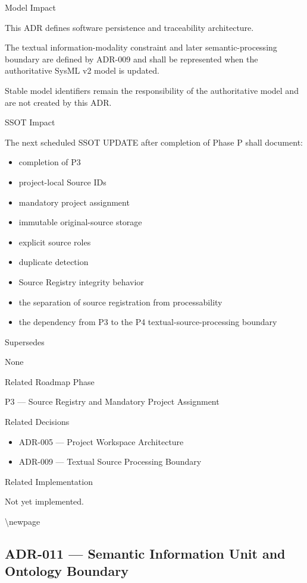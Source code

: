Model Impact

This ADR defines software persistence and traceability architecture.

The textual information-modality constraint and later semantic-processing boundary are defined by ADR-009 and shall be represented when the authoritative SysML v2 model is updated.

Stable model identifiers remain the responsibility of the authoritative model and are not created by this ADR.

SSOT Impact

The next scheduled SSOT UPDATE after completion of Phase P shall document:

\begin{itemize}
\tightlist
\item
  completion of P3
\item
  project-local Source IDs
\item
  mandatory project assignment
\item
  immutable original-source storage
\item
  explicit source roles
\item
  duplicate detection
\item
  Source Registry integrity behavior
\item
  the separation of source registration from processability
\item
  the dependency from P3 to the P4 textual-source-processing boundary
\end{itemize}

Supersedes

None

Related Roadmap Phase

P3 --- Source Registry and Mandatory Project Assignment

Related Decisions

\begin{itemize}
\tightlist
\item
  ADR-005 --- Project Workspace Architecture
\item
  ADR-009 --- Textual Source Processing Boundary
\end{itemize}

Related Implementation

Not yet implemented.

\textbackslash newpage

\hypertarget{adr-011--semantic-information-unit-and-ontology-boundary}{%
\subsection{ADR-011 --- Semantic Information Unit and Ontology Boundary}\label{adr-011--semantic-information-unit-and-ontology-boundary}}

